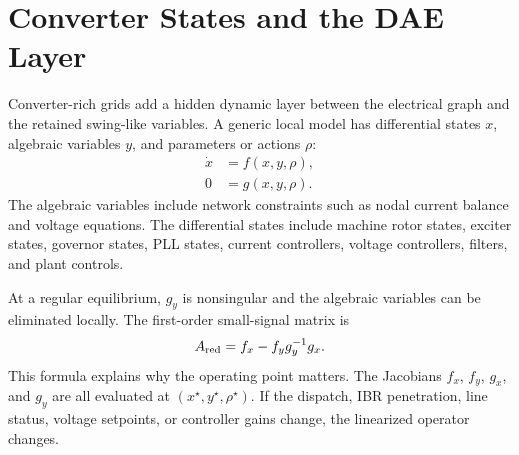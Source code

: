 \section{Converter States and the DAE Layer}

Converter-rich grids add a hidden dynamic layer between the electrical graph
and the retained swing-like variables. A generic local model has differential
states \(x\), algebraic variables \(y\), and parameters or actions \(\rho\):
\begin{align}
  \dot x &= f(x,y,\rho), \label{eq:framework_dae_f}\\
  0 &= g(x,y,\rho). \label{eq:framework_dae_g}
\end{align}
The algebraic variables include network constraints such as nodal current
balance and voltage equations. The differential states include machine rotor
states, exciter states, governor states, PLL states, current controllers,
voltage controllers, filters, and plant controls.

At a regular equilibrium, \(g_y\) is nonsingular and the algebraic variables
can be eliminated locally. The first-order small-signal matrix is
\begin{equation}
  A_{\rm red}=f_x-f_y g_y^{-1}g_x .
  \label{eq:framework_reduced_A}
\end{equation}
This formula explains why the operating point matters. The Jacobians \(f_x\),
\(f_y\), \(g_x\), and \(g_y\) are all evaluated at
\((x^\star,y^\star,\rho^\star)\). If the dispatch, IBR penetration, line
status, voltage setpoints, or controller gains change, the linearized operator
changes.

